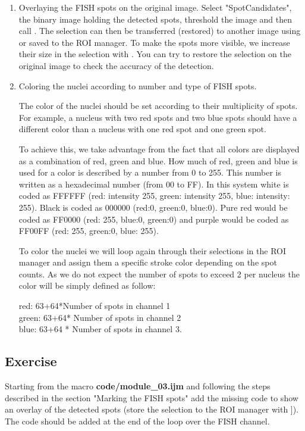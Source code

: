 \begin{enumerate}
    \item Overlaying the FISH spots on the original image.
    Select "SpotCandidates", the binary image holding the detected spots, threshold the image and then call . The selection can then be transferred (restored) to another image using  or saved to the ROI manager. To make the spots more visible, we increase their size in the selection with . You can try to restore the selection on the original image to check the accuracy of the detection.

\item Coloring the nuclei according to number and type of FISH spots.
    
    The color of the nuclei should be set according to their multiplicity of spots. For example, a nucleus with two red spots and two blue spots should have a different color than a nucleus with one red spot and one green spot.
    
    To achieve this, we take advantage from the fact that all colors are displayed as a combination of red, green and blue. How much of red, green and blue is used for a color is described by a number from 0 to 255. This number is written as a hexadecimal number (from 00 to FF). In this system white is coded as FFFFFF (red: intensity 255, green: intensity 255, blue: intensity: 255). Black is coded as 000000 (red:0, green:0, blue:0). Pure red would be coded as FF0000 (red: 255, blue:0, green:0) and purple would be coded as FF00FF (red: 255, green:0, blue: 255).
    
    To color the nuclei we will loop again through their selections in the ROI manager and assign them a specific stroke color depending on the spot counts. As we do not expect the number of spots to exceed 2 per nucleus the color will be simply defined as follow:
    
    red: 63+64*Number of spots in channel 1\\
    green: 63+64* Number of spots in channel 2\\
    blue: 63+64 * Number of spots in channel 3.
    

\end{enumerate}

\subsection{Exercise  }
Starting from the macro \textbf{code/module\_03.ijm} and following the steps described in the section "Marking the FISH spots" add the missing code to show an overlay of the detected spots (store the selection to the ROI manager with \ijmenu{[Edit > Selection > Add to Manager}]). The code should be added at the end of the loop over the FISH channel.

